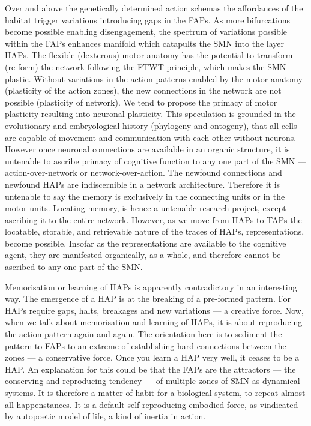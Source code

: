 Over and above the genetically determined action schemas the affordances of the habitat trigger variations introducing gaps in the FAPs. As more bifurcations become possible enabling disengagement, the spectrum of variations possible within the FAPs enhances manifold which catapults the SMN into the layer HAPs. The flexible (dexterous) motor anatomy has the potential to transform (re-form) the network following the FTWT principle, which makes the SMN plastic. Without variations in the action patterns enabled by the motor anatomy (plasticity of the action zones), the new connections in the network are not possible (plasticity of network). We tend to propose the primacy of motor plasticity resulting into neuronal plasticity. This speculation is grounded in the evolutionary and embryological history (phylogeny and ontogeny), that all cells are capable of movement and communication with each other without neurons. However once neuronal connections are available in an organic structure, it is untenable to ascribe primacy of cognitive function to any one part of the SMN --- action-over-network or network-over-action. The newfound connections and newfound HAPs are indiscernible in a network architecture. Therefore it is untenable to say the memory is exclusively in the connecting units or in the motor units. Locating memory, is hence a untenable research project, except ascribing it to the entire network. However, as we move from HAPs to TAPs the locatable, storable, and retrievable nature of the traces of HAPs, representations, become possible. Insofar as the representations are available to the cognitive agent, they are manifested organically, as a whole, and therefore cannot be ascribed to any one part of the SMN. 

Memorisation or learning of HAPs is apparently contradictory in an interesting way. The emergence of a HAP is at the breaking of a pre-formed pattern. For HAPs require gaps, halts, breakages and new variations --- a creative force. Now, when we talk about memorisation and learning of HAPs, it is about reproducing the action pattern again and again. The orientation here is to sediment the pattern to FAPs to an extreme of establishing hard connections between the zones --- a conservative force. Once you learn a HAP very well, it ceases to be a HAP. An explanation for this could be that the FAPs are the attractors ---  the conserving and reproducing tendency --- of multiple zones of SMN as dynamical systems. It is therefore a matter of habit for a biological system, to repeat almost all happenstances. It is a default self-reproducing embodied force, as vindicated by autopoetic model of life, a kind of inertia in action. 

